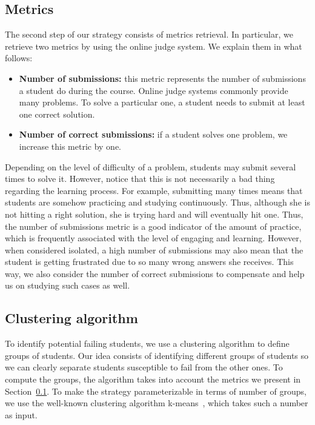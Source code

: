 \subsection{Metrics}

\label{sec:metrics}

The second step of our strategy consists of metrics retrieval. In particular, we retrieve two metrics by using the online judge system. We explain them in what follows:

\begin{itemize}

	\item \textbf{Number of submissions:} this metric represents the number of submissions a student do during the course. Online judge systems commonly provide many problems. To solve a particular one, a student needs to submit at least one correct solution.

	\item \textbf{Number of correct submissions:} if a student solves one problem, we increase this metric by one.

\end{itemize}

Depending on the level of difficulty of a problem, students may submit several times to solve it. However, notice that this is not necessarily a bad thing regarding the learning process. For example, submitting many times means that students are somehow practicing and studying continuously. Thus, although she is not hitting a right solution, she is trying hard and will eventually hit one. Thus, the number of submissions metric is a good indicator of the amount of practice, which is frequently associated with the level of engaging and learning. However, when considered isolated, a high number of submissions may also mean that the student is getting frustrated due to so many wrong answers she receives. This way, we also consider the number of correct submissions to compensate and help us on studying such cases as well.


\subsection{Clustering algorithm}

To identify potential failing students, we use a clustering algorithm to define groups of students. Our idea consists of identifying different groups of students so we can clearly separate students susceptible to fail from the other ones. To compute the groups, the algorithm takes into account the metrics we present in Section~\ref{sec:metrics}. To make the strategy parameterizable in terms of number of groups, we use the well-known clustering algorithm k-means~\cite{}, which takes such a number as input.


